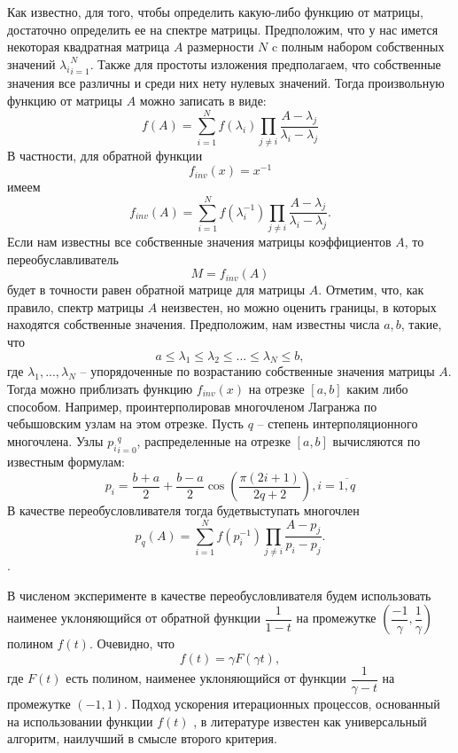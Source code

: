 \documentclass[a4paper,14pt]{extreport}
\begin{document}
 Как известно, для того, чтобы определить какую-либо функцию от матрицы, достаточно определить ее на спектре матрицы. Предположим, что у нас имется некоторая квадратная матрица $A$ размерности $N$  c полным набором собственных значений ${\lambda_i}^N_{i=1}$. Также для простоты изложения предполагаем, что собственные значения все различны и среди них нету нулевых значений. Тогда произвольную функцию  от матрицы $A$ можно записать в виде:
	 \begin{equation}
	\label{invf1}
	f(A)=\sum_{i=1}^{N} f(\lambda_i) \prod_{j  \neq i} \dfrac{A - \lambda_j}{\lambda_i - \lambda_j}
	\end{equation}
В частности, для обратной функции
	$$
	f_{inv}(x) = x^{-1} 
	$$
имеем 
	 \begin{equation}
	\label{invf2}
	f_{inv}(A) =\sum_{i=1}^{N} f(\lambda_i^{-1}) \prod_{j  \neq i} \dfrac{A - \lambda_j}{\lambda_i - \lambda_j}.
	\end{equation}
Если нам известны все собственные значения матрицы коэффициентов $A$, то переобуславливатель
	 \begin{equation}
	\label{invf3}
	M =f_{inv}(A)
	\end{equation}
будет в точности равен обратной матрице для матрицы $A$. Отметим, что,  как правило, спектр матрицы $A$ неизвестен, но можно оценить границы, в которых находятся собственные значения. Предположим, нам известны числа $a, b$, такие, что
	$$
	a \leq \lambda_1 \leq \lambda_2 \leq ... \leq \lambda_N \leq b,
	$$
где $\lambda_1, ..., \lambda_N$ -- упорядоченные по возрастанию собственные значения матрицы $A$. Тогда можно приблизать функцию $f_{inv}(x)$ на отрезке $[a, b]$ каким либо способом. Например, проинтерполировав многочленом Лагранжа по чебышовским узлам на этом отрезке.  Пусть $q$ -- степень интерполяционного многочлена. Узлы ${p_i}_{i=0}^q$, распределенные на отрезке $[a, b]$ вычисляются по известным формулам:
 	\begin{equation}
	\label{precondLagr1}
	p_i = \dfrac{b+a}{2} +\dfrac{b-a}{2}\cos(\dfrac{\pi(2i+1)}{2q+2}), i=\overbar{1, q}
	\end{equation}
В качестве переобусловливателя тогда будетвыступать многочлен
	\begin{equation}
	\label{precondLagr2}
	p_q(A) =\sum_{i=1}^{N} f(p_i^{-1}) \prod_{j  \neq i} \dfrac{A - p_j}{p_i - p_j}.
	\end{equation}.

В численом эксперименте в качестве переобусловливателя будем использовать наименее уклоняющийся от обратной функции $\dfrac{1}{1-t}$ на промежутке $(\dfrac{-1}{\gamma}, \dfrac{1}{\gamma})$ полином $f(t)$. Очевидно, что 
$$f(t) = \gamma F(\gamma t),$$
где $F(t)$ есть полином, наименее уклоняющийся от функции $\dfrac{1}{\gamma - t}$ на промежутке $(-1, 1)$. Подход ускорения итерационных процессов, основанный на использовании функции $f(t)$ , в литературе известен как универсальный алгоритм, наилучший в смысле второго критерия\cite{fadeev}.
\end{document}
